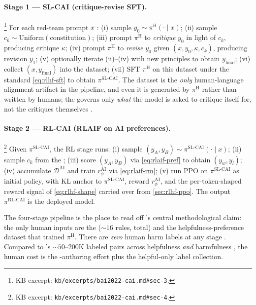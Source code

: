 \paragraph{Stage 1 — SL-CAI (critique-revise SFT).}%
\footnote{KB excerpt: \nolinkurl{kb/excerpts/bai2022-cai.md#sec-3}.}
For each red-team prompt $x$
\citep[\S 3]{bai2022-cai}: (i) sample $y_0 \sim \pi^{\mathrm{H}}(\cdot
\mid x)$; (ii) sample $c_k \sim \mathrm{Uniform}(\text{constitution})$;
(iii) prompt $\pi^{\mathrm{H}}$ to \emph{critique} $y_0$ in light of
$c_k$, producing critique $\kappa$; (iv) prompt $\pi^{\mathrm{H}}$ to
\emph{revise} $y_0$ given $(x, y_0, \kappa, c_k)$, producing revision
$y_1$; (v) optionally iterate (ii)--(iv) with new principles to obtain
$y_{\mathrm{final}}$; (vi) collect $(x, y_{\mathrm{final}})$ into the
 dataset; (vii) SFT $\pi^{\mathrm{H}}$ on this dataset under
the standard  \cref{eq:rlhf-sft} to obtain
$\pi^{\mathrm{SL\text{-}CAI}}$. The  dataset is the \emph{only}
human-language alignment artifact in the pipeline, and even it is
generated by $\pi^{\mathrm{H}}$ rather than written by humans; the
 governs only \emph{what} the model is asked to critique
itself for, not the critiques themselves \citep[\S 3]{bai2022-cai}.

\paragraph{Stage 2 — RL-CAI (RLAIF on AI preferences).}%
\footnote{KB excerpt: \nolinkurl{kb/excerpts/bai2022-cai.md#sec-4}.}
Given $\pi^{\mathrm{SL\text{-}CAI}}$, the RL stage \citep[\S
4]{bai2022-cai} runs: (i) sample $(y_A, y_B) \sim
\pi^{\mathrm{SL\text{-}CAI}}(\cdot \mid x)$; (ii) sample $c_k$ from the
; (iii) score $(y_A, y_B)$ via \cref{eq:rlaif-pref} to obtain
$(y_w, y_l)$; (iv) accumulate $\mathcal{D}^{\mathrm{AI}}$ and train
$r_\phi^{\mathrm{AI}}$ via \cref{eq:rlaif-rm}; (v) run PPO on
$\pi^{\mathrm{SL\text{-}CAI}}$ as initial policy, with KL anchor to
$\pi^{\mathrm{SL\text{-}CAI}}$, reward $r_\phi^{\mathrm{AI}}$, and the
per-token-shaped reward signal of \cref{eq:rlhf-shape} carried over
from \cref{sec:rlhf-ppo}. The output $\pi^{\mathrm{RL\text{-}CAI}}$ is
the deployed model.

The four-stage pipeline is the place to read off 's central
methodological claim: the only human inputs are the 
($\sim\!16$ rules, total) and the helpfulness-preference dataset that
trained $\pi^{\mathrm{H}}$. There are \emph{zero} human harm labels at
any stage \citep[\S abstract]{bai2022-cai}. Compared to 's
$\sim\!50\text{--}200$K labeled pairs across helpfulness \emph{and}
harmfulness \citep[\S 3]{ouyang2022-instructgpt}, the  human cost is
the -authoring effort plus the helpful-only label
collection.

